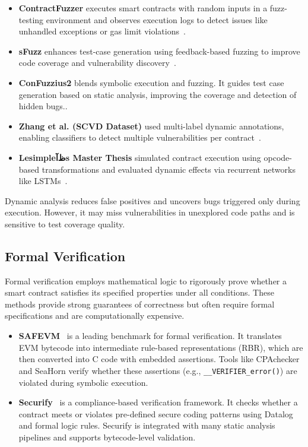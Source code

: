 \begin{itemize}
  \item \textbf{ContractFuzzer} executes smart contracts with random inputs in a fuzz-testing environment and observes execution logs to detect issues like unhandled exceptions or gas limit violations~\cite{feng2024interpretable}.
  \item \textbf{sFuzz} enhances test-case generation using feedback-based fuzzing to improve code coverage and vulnerability discovery~\cite{feng2024interpretable}.
  \item \textbf{ConFuzzius2} blends symbolic execution and fuzzing. It guides test case generation based on static analysis, improving the coverage and detection of hidden bugs..
  \item \textbf{Zhang et al. (SCVD Dataset)} used multi-label dynamic annotations, enabling classifiers to detect multiple vulnerabilities per contract~\cite{zhang2020scvd}.
  \item \textbf{Lesimpleظآs Master Thesis} simulated contract execution using opcode-based transformations and evaluated dynamic effects via recurrent networks like LSTMs~\cite{lesimple2020master}.
\end{itemize}

Dynamic analysis reduces false positives and uncovers bugs triggered only during execution. However, it may miss vulnerabilities in unexplored code paths and is sensitive to test coverage quality.

\subsection*{Formal Verification}

Formal verification employs mathematical logic to rigorously prove whether a smart contract satisfies its specified properties under all conditions. These methods provide strong guarantees of correctness but often require formal specifications and are computationally expensive.

\begin{itemize}
  \item \textbf{SAFEVM}~\cite{albert2019safevm} is a leading benchmark for formal verification. It translates EVM bytecode into intermediate rule-based representations (RBR), which are then converted into C code with embedded assertions. Tools like CPAchecker and SeaHorn verify whether these assertions (e.g., \texttt{\_\_VERIFIER\_error()}) are violated during symbolic execution.
  \item \textbf{Securify}~\cite{durieux2020empirical} is a compliance-based verification framework. It checks whether a contract meets or violates pre-defined secure coding patterns using Datalog and formal logic rules. Securify is integrated with many static analysis pipelines and supports bytecode-level validation.
\end{itemize}

